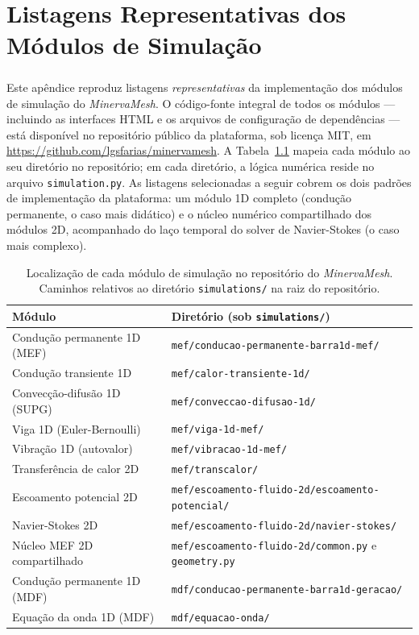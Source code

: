 \chapter{Listagens Representativas dos Módulos de Simulação}
\label{ap:listagens}

\paragraph{}Este apêndice reproduz listagens \emph{representativas} da implementação dos módulos de simulação do \textit{MinervaMesh}. O código-fonte integral de todos os módulos --- incluindo as interfaces HTML e os arquivos de configuração de dependências --- está disponível no repositório público da plataforma, sob licença MIT, em \url{https://github.com/lgsfarias/minervamesh}. A Tabela~\ref{tab:repo_modulos} mapeia cada módulo ao seu diretório no repositório; em cada diretório, a lógica numérica reside no arquivo \texttt{simulation.py}. As listagens selecionadas a seguir cobrem os dois padrões de implementação da plataforma: um módulo 1D completo (condução permanente, o caso mais didático) e o núcleo numérico compartilhado dos módulos 2D, acompanhado do laço temporal do solver de Navier-Stokes (o caso mais complexo).

\begin{table}[H]
\centering
\caption{Localização de cada módulo de simulação no repositório do \textit{MinervaMesh}. Caminhos relativos ao diretório \texttt{simulations/} na raiz do repositório.}
\label{tab:repo_modulos}
\footnotesize
\begin{tabular}{ll}
\hline
\textbf{Módulo} & \textbf{Diretório (sob \texttt{simulations/})} \\
\hline
Condução permanente 1D (MEF)     & \texttt{mef/conducao-permanente-barra1d-mef/} \\
Condução transiente 1D           & \texttt{mef/calor-transiente-1d/} \\
Convecção-difusão 1D (SUPG)      & \texttt{mef/conveccao-difusao-1d/} \\
Viga 1D (Euler-Bernoulli)        & \texttt{mef/viga-1d-mef/} \\
Vibração 1D (autovalor)          & \texttt{mef/vibracao-1d-mef/} \\
Transferência de calor 2D        & \texttt{mef/transcalor/} \\
Escoamento potencial 2D          & \texttt{mef/escoamento-fluido-2d/escoamento-potencial/} \\
Navier-Stokes 2D                 & \texttt{mef/escoamento-fluido-2d/navier-stokes/} \\
Núcleo MEF 2D compartilhado      & \texttt{mef/escoamento-fluido-2d/common.py} e \texttt{geometry.py} \\
Condução permanente 1D (MDF)     & \texttt{mdf/conducao-permanente-barra1d-geracao/} \\
Equação da onda 1D (MDF)         & \texttt{mdf/equacao-onda/} \\
\hline
\end{tabular}
\end{table}

